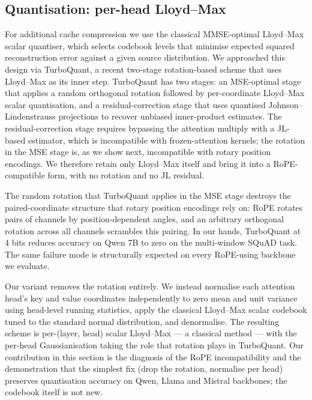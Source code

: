 \subsection{Quantisation: per-head Lloyd--Max}\label{sec:quant}

For additional cache compression we use the classical MMSE-optimal
Lloyd--Max scalar quantiser\cite{lloyd1982least,max1960quantizing},
which selects codebook levels that minimise expected squared
reconstruction error against a given source distribution. We
approached this design via TurboQuant\cite{zandieh2026turboquant}, a
recent two-stage rotation-based scheme that uses Lloyd--Max as its
inner step. TurboQuant has two stages: an MSE-optimal stage that
applies a random orthogonal rotation followed by per-coordinate
Lloyd--Max scalar quantisation, and a residual-correction stage that
uses quantised Johnson--Lindenstrauss projections to recover unbiased
inner-product estimates. The residual-correction stage requires
bypassing the attention multiply with a JL-based estimator, which is
incompatible with frozen-attention kernels; the rotation in the MSE
stage is, as we show next, incompatible with rotary position
encodings. We therefore retain only Lloyd--Max itself and bring it
into a RoPE-compatible form, with no rotation and no JL residual.

The random rotation that TurboQuant applies in the MSE stage destroys
the paired-coordinate structure that rotary position
encodings\cite{su2024rope} rely on: RoPE rotates pairs of channels by
position-dependent angles, and an arbitrary orthogonal rotation across
all channels scrambles this pairing. In our hands, TurboQuant at 4
bits reduces accuracy on Qwen 7B to zero on the multi-window SQuAD
task. The same failure mode is structurally expected on every
RoPE-using backbone we evaluate.

Our variant removes the rotation entirely. We instead normalise each
attention head's key and value coordinates independently to zero mean
and unit variance using head-level running statistics, apply the
classical Lloyd--Max scalar codebook tuned to the standard normal
distribution, and denormalise. The resulting scheme is per-(layer,
head) scalar Lloyd--Max --- a classical method --- with the per-head
Gaussianisation taking the role that rotation plays in TurboQuant. Our
contribution in this section is the diagnosis of the RoPE
incompatibility and the demonstration that the simplest fix (drop the
rotation, normalise per head) preserves quantisation accuracy on
Qwen, Llama and Mistral backbones; the codebook itself is not new.

